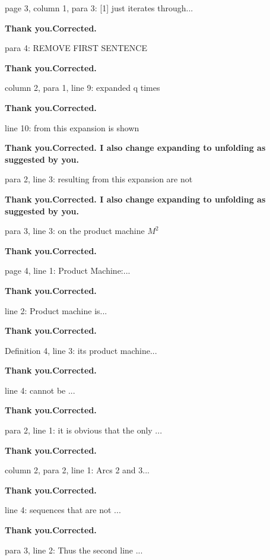 \documentclass[journal]{IEEEtran}
\begin{document}
{page 3, column 1, para 3: [1] just iterates through...

\smallskip
\textbf{Thank you.Corrected.}
\smallskip

                                 para 4: REMOVE FIRST SENTENCE

\smallskip
\textbf{Thank you.Corrected.}
\smallskip

             column 2, para 1, line 9: expanded q times

\smallskip
\textbf{Thank you.Corrected.}
\smallskip

line 10: from this expansion is shown

\smallskip
\textbf{Thank you.Corrected.
I also change expanding to unfolding as suggested by you.}
\smallskip


para 2, line 3: resulting from this expansion are not

\smallskip
\textbf{Thank you.Corrected.
I also change expanding to unfolding as suggested by you.}
\smallskip

                                 para 3, line 3: on the product machine $M^2$

\smallskip
\textbf{Thank you.Corrected.}
\smallskip

page 4, line 1: Product Machine:...

\smallskip
\textbf{Thank you.Corrected.}
\smallskip

              line 2: Product machine is...

\smallskip
\textbf{Thank you.Corrected.}
\smallskip

Definition 4, line 3: its product machine...

\smallskip
\textbf{Thank you.Corrected.}
\smallskip

                        line 4: cannot be ...

\smallskip
\textbf{Thank you.Corrected.}
\smallskip

                        para 2, line 1: it is obvious that the only ...

\smallskip
\textbf{Thank you.Corrected.}
\smallskip

column 2, para 2, line 1: Arcs 2 and 3...

\smallskip
\textbf{Thank you.Corrected.}
\smallskip

                                 line 4: sequences that are not ...

\smallskip
\textbf{Thank you.Corrected.}
\smallskip

                   para 3, line 2: Thus the second line ...

}
\end{document}
